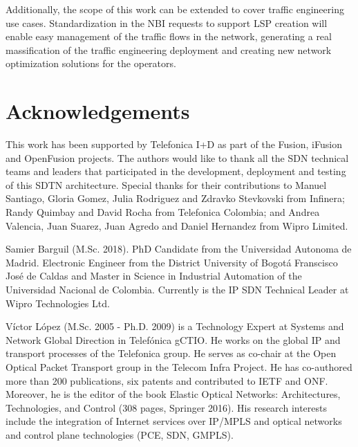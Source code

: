 \documentclass[a4paper,fleqn]{cas-dc}
\begin{document}
Additionally, the scope of this work can be extended to cover traffic engineering use cases. Standardization in the NBI requests to support LSP creation will enable easy management of the traffic flows in the network, generating a real massification of the traffic engineering deployment and creating new network optimization solutions for the operators.

\printcredits

\section*{Acknowledgements}
This work has been supported by Telefonica I+D as part of the Fusion, iFusion and OpenFusion projects. The authors would like to thank all the SDN technical teams and leaders that participated in the development, deployment and testing of this SDTN architecture. Special thanks for their contributions to Manuel Santiago, Gloria Gomez, Julia Rodriguez and Zdravko Stevkovski from Infinera; Randy Quimbay and David Rocha from Telefonica Colombia; and Andrea Valencia, Juan Suarez, Juan Agredo and Daniel Hernandez from Wipro Limited.   


%
%






Samier Barguil (M.Sc. 2018). PhD Candidate from the Universidad Autonoma de Madrid. Electronic Engineer from the District University of Bogot\'a Franscisco Jos\'e de Caldas and Master in Science in Industrial Automation of the Universidad Nacional de Colombia. Currently is the IP SDN Technical Leader at Wipro Technologies Ltd. 
\endbio

Víctor López (M.Sc. 2005 - Ph.D. 2009) is a Technology Expert at Systems and Network Global Direction in Telefónica gCTIO. He works on the global IP and transport processes of the Telefonica group. He serves as co-chair at the Open Optical Packet Transport group in the Telecom Infra Project. He has co-authored more than 200 publications, six patents and contributed to IETF and ONF. Moreover, he is the editor of the book Elastic Optical Networks: Architectures, Technologies, and Control (308 pages, Springer 2016). His research interests include the integration of Internet services over IP/MPLS and optical networks and control plane technologies (PCE, SDN, GMPLS).
\endbio
\end{document}
